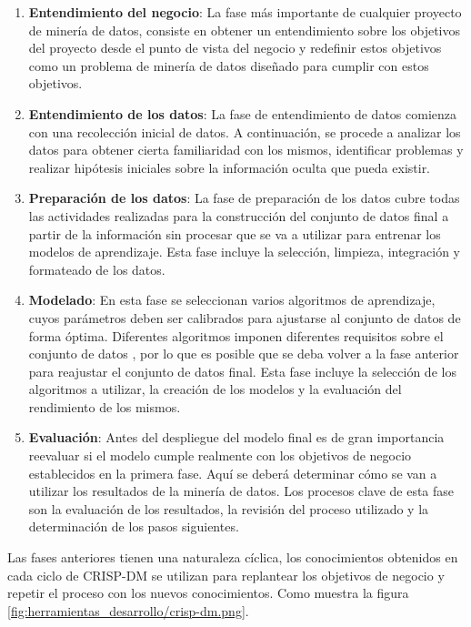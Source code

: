 \begin{enumerate}
    \item \textbf{Entendimiento del negocio}: La fase más importante de
    cualquier proyecto de minería de datos, consiste en obtener un entendimiento
    sobre los objetivos del proyecto desde el punto de vista del negocio y
    redefinir estos objetivos como un problema de minería de datos diseñado para
    cumplir con estos objetivos.
    \item \textbf{Entendimiento de los datos}: La fase de entendimiento de datos
    comienza con una recolección inicial de datos. A continuación, se procede a
    analizar los datos para obtener cierta familiaridad con los mismos,
    identificar problemas y realizar hipótesis iniciales sobre la información
    oculta que pueda existir.
    \item \textbf{Preparación de los datos}: La fase de preparación de los datos
    cubre todas las actividades realizadas para la construcción del conjunto de
    datos final a partir de la información sin procesar que se va a utilizar
    para entrenar los modelos de aprendizaje. Esta fase incluye la selección,
    limpieza, integración y formateado de los datos.
    \item \textbf{Modelado}: En esta fase se seleccionan varios algoritmos de
    aprendizaje, cuyos parámetros deben ser calibrados para ajustarse al
    conjunto de datos de forma óptima. Diferentes algoritmos imponen diferentes
    requisitos sobre el conjunto de datos , por lo que es posible que se deba
    volver a la fase anterior para reajustar el conjunto de datos final. Esta
    fase incluye la selección de los algoritmos a utilizar, la creación de los
    modelos y la evaluación del rendimiento de los mismos.
    \item \textbf{Evaluación}: Antes del despliegue del modelo final es de gran
    importancia reevaluar si el modelo cumple realmente con los objetivos de
    negocio establecidos en la primera fase. Aquí se deberá determinar cómo se
    van a utilizar los resultados de la minería de datos. Los procesos clave de
    esta fase son la evaluación de los resultados, la revisión del proceso
    utilizado y la determinación de los pasos siguientes.
\end{enumerate}

Las fases anteriores tienen una naturaleza cíclica, los conocimientos obtenidos
en cada ciclo de CRISP-DM se utilizan para replantear los objetivos de negocio y
repetir el proceso con los nuevos conocimientos. Como muestra la figura
\ref{fig:herramientas_desarrollo/crisp-dm.png}.

